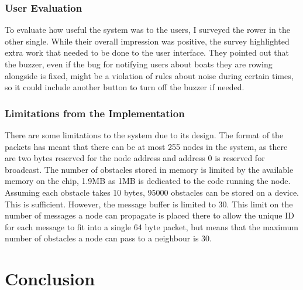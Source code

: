 \documentclass[12pt,a4paper]{report}
\newcommand{\newchapter}[2]{
    \setcounter{chapter}{#1}
    \setcounter{section}{0}
    \chapter*{#2}
    \addcontentsline{toc}{chapter}{#1 #2}
}
\begin{document}
\subsection{User Evaluation}
To evaluate how useful the system was to the users, I surveyed the rower in the other single. While their overall impression was positive, the survey highlighted extra work that needed to be done to the user interface. They pointed out that the buzzer, even if the bug for notifying users about boats they are rowing alongside is fixed, might be a violation of rules about noise during certain times, so it could include another button to turn off the buzzer if needed. \\

\subsection{Limitations from the Implementation}
There are some limitations to the system due to its design. The format of the packets has meant that there can be at most 255 nodes in the system, as there are two bytes reserved for the node address and address 0 is reserved for broadcast. The number of obstacles stored in memory is limited by the available memory on the chip, 1.9MB as 1MB is dedicated to the code running the node. Assuming each obstacle takes 10 bytes, 95000 obstacles can be stored on a device. This is sufficient. However, the message buffer is limited to 30. This limit on the number of messages a node can propagate is placed there to allow the unique ID for each message to fit into a single 64 byte packet, but means that the maximum number of obstacles a node can pass to a neighbour is 30.

\newchapter{5}{Conclusion}
\setcounter{figure}{0}
\end{document}
